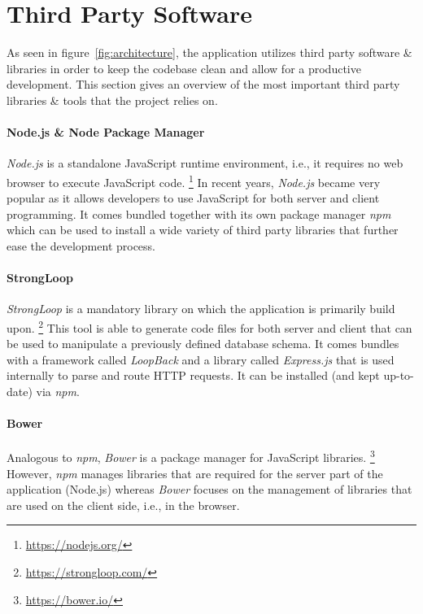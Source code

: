 \documentclass[nochapterpage,nopartpage,noheadingspace,numbersubsubsec,bigchapter,colorback,accentcolor=tud9c,10pt]{tudreport}
\begin{document}
  \section{Third Party Software}
  \label{sec:tech:architecture:3rd-party}

    As seen in figure~\ref{fig:architecture}, the application utilizes third party software \& libraries in order to keep the codebase clean and allow for a productive development. This section gives an overview of the most important third party libraries \& tools that the project relies on.

  \paragraph{Node.js \& Node Package Manager}
    \emph{Node.js} is a standalone JavaScript runtime environment, i.e., it requires no web browser to execute JavaScript code.%
    \footnote{\url{https://nodejs.org/}}
    In recent years, \emph{Node.js} became very popular as it allows developers to use JavaScript for both server and client programming. It comes bundled together with its own package manager \emph{npm} which can be used to install a wide variety of third party libraries that further ease the development process.

  \paragraph{StrongLoop}
    \emph{StrongLoop} is a mandatory library on which the application is primarily build upon.%
    \footnote{\url{https://strongloop.com/}}
    This tool is able to generate code files for both server and client that can be used to manipulate a previously defined database schema. It comes bundles with a framework called \emph{LoopBack} and a library called \emph{Express.js} that is used internally to parse and route HTTP requests. It can be installed (and kept up-to-date) via \emph{npm}.

  \paragraph{Bower}
    Analogous to \emph{npm}, \emph{Bower} is a package manager for JavaScript libraries.%
    \footnote{\url{https://bower.io/}}
    However, \emph{npm} manages libraries that are required for the server part of the application (Node.js) whereas \emph{Bower} focuses on the management of libraries that are used on the client side, i.e., in the browser.
\end{document}
